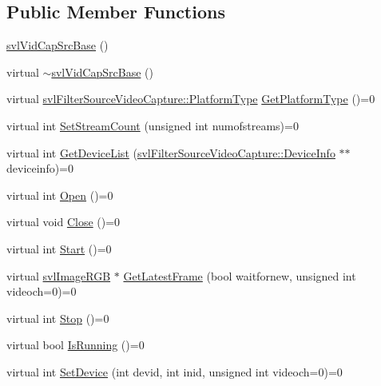 \subsection*{Public Member Functions}
\begin{DoxyCompactItemize}
\item 
\hyperlink{classsvl_vid_cap_src_base_ab8cc8201078038fd5f5313c05f87dcac}{svl\+Vid\+Cap\+Src\+Base} ()
\item 
virtual \hyperlink{classsvl_vid_cap_src_base_a77cc24bcfb46dff52df9f6d2dd1d90b9}{$\sim$svl\+Vid\+Cap\+Src\+Base} ()
\item 
virtual \hyperlink{namespacesvl_filter_source_video_capture_types_aa8ef2b6d9a414a8970cc722eaa37b32b}{svl\+Filter\+Source\+Video\+Capture\+::\+Platform\+Type} \hyperlink{classsvl_vid_cap_src_base_a68051fa2425450d680972590ca46d3fc}{Get\+Platform\+Type} ()=0
\item 
virtual int \hyperlink{classsvl_vid_cap_src_base_ae404263240c88e7752f5951b3e7a0ec3}{Set\+Stream\+Count} (unsigned int numofstreams)=0
\item 
virtual int \hyperlink{classsvl_vid_cap_src_base_ada28da77dd5c4a52f018b0499a07f8cb}{Get\+Device\+List} (\hyperlink{classsvl_filter_source_video_capture_ad656487fb2deec890dc39764152b8f8b}{svl\+Filter\+Source\+Video\+Capture\+::\+Device\+Info} $\ast$$\ast$deviceinfo)=0
\item 
virtual int \hyperlink{classsvl_vid_cap_src_base_a2855a57b3e6bb2be4a1020600fb76b4b}{Open} ()=0
\item 
virtual void \hyperlink{classsvl_vid_cap_src_base_a7a3a449ce94eee9ebe05111bb98dea2b}{Close} ()=0
\item 
virtual int \hyperlink{classsvl_vid_cap_src_base_a591d834d9e9667140032244038419080}{Start} ()=0
\item 
virtual \hyperlink{svl_types_8h_a7b03c3d61bbbbf8fe59585453969d250}{svl\+Image\+R\+G\+B} $\ast$ \hyperlink{classsvl_vid_cap_src_base_a262ea84a6bd1dfda77e41a1e04525fc8}{Get\+Latest\+Frame} (bool waitfornew, unsigned int videoch=0)=0
\item 
virtual int \hyperlink{classsvl_vid_cap_src_base_a8991f55335b8fb8aaf8a20ed28435a86}{Stop} ()=0
\item 
virtual bool \hyperlink{classsvl_vid_cap_src_base_a5ffea8235203732a10dadacf8feb5a4d}{Is\+Running} ()=0
\item 
virtual int \hyperlink{classsvl_vid_cap_src_base_a140b325929146f88f394e5c5dc6b11bf}{Set\+Device} (int devid, int inid, unsigned int videoch=0)=0
\item 
$$
\end{DoxyCompactItemize}
